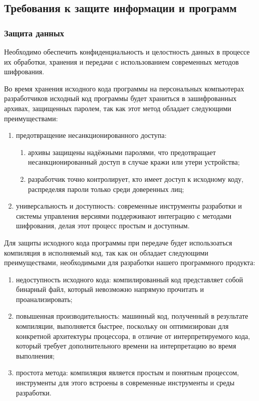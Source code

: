 \documentclass[14pt,a4paper,final]{extreport}
\begin{document}
\pagebreak %

\subsection{Требования к защите информации и программ}

\fancyhead[C]{\bfseries\thepage\\\docstamp}  %

\subsubsection{Защита данных}
Необходимо обеспечить конфиденциальность и целостность данных в процессе их обработки, хранения и передачи с использованием современных методов шифрования.

Во время хранения исходного кода программы на персональных компьютерах разработчиков исходный код программы будет храниться в зашифрованных архивах, защищенных паролем, так как этот метод обладает следующими преимуществами:
\begin{enumerate}[label=\asbuk*),ref=\asbuk*]
	\item предотвращение несанкционированного доступа:  
		\begin{enumerate}[label=\arabic*.]
			\item архивы защищены надёжными паролями, что предотвращает несанкционированный доступ в случае кражи или утери устройства;
			\item разработчик точно контролирует, кто имеет доступ к исходному коду, распределяя пароли только среди доверенных лиц;
		\end{enumerate}

	\item универсальность и доступность: современные инструменты разработки и системы управления версиями поддерживают интеграцию с методами шифрования, делая этот процесс простым и доступным.
\end{enumerate} 


Для защиты исходного кода программы при передаче будет использоаться компиляция в исполняемый код, так как он обладает следующими преимуществами, необходимыми для разработки нашего программного продукта:
\begin{enumerate}[label=\asbuk*),ref=\asbuk*]
	\item недоступность исходного кода: компилированный код представляет собой бинарный файл, который невозможно напрямую прочитать и проанализировать;

	\item повышенная производительность: машинный код, полученный в результате компиляции, выполняется быстрее, поскольку он оптимизирован для конкретной архитектуры процессора, в отличие от интерпретируемого кода, который требует дополнительного времени на интерпретацию во время выполнения;

\pagebreak %

	\item простота метода: компиляция является простым и понятным процессом, инструменты для этого встроены в современные инструменты и среды разработки. 
\end{enumerate} 
\end{document}
